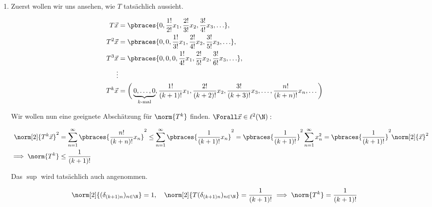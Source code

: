 \begin{solution}

\phantom{}

\begin{enumerate}[label = (\alph*)]

  \item
  Zuerst wollen wir uns ansehen, wie $T$ tatsächlich aussieht.

  \begin{align*}
    T \vec x
    & =
    \pbraces
    {
      0,
      \frac{1!}{2!} x_1,
      \frac{2!}{3!} x_2,
      \frac{3!}{4!} x_3,
      \ldots
    }, \\
    T^2 \vec x
    & =
    \pbraces
    {
      0, 0,
      \frac{1!}{3!} x_1,
      \frac{2!}{4!} x_2,
      \frac{3!}{5!} x_3,
      \ldots
    }, \\
    T^3 \vec x
    & =
    \pbraces
    {
      0, 0, 0,
      \frac{1!}{4!} x_1,
      \frac{2!}{5!} x_2,
      \frac{3!}{6!} x_3,
      \ldots
    }, \\
    \vdots \\
    T^k \vec x
    & =
    \bigg (
      \underbrace{0, \ldots, 0}_{k \text{-mal}},
      \frac{1!}{(k+1)!} x_1,
      \frac{2!}{(k+2)!} x_2,
      \frac{3!}{(k+3)!} x_3,
      \ldots,
      \frac{n!}{(k+n)!} x_n,
      \ldots
    \bigg )
  \end{align*}

  Wir wollen nun eine geeignete Abschätzung für $\norm{T^k}$ finden.
  $\Forall \vec x \in \ell^2(\N):$

  \begin{align*}
    \norm[2]{T^k \vec x}^2
    & =
    \sum_{n=1}^\infty
    \pbraces
    {
      \frac{n!}{(k+n)!}
      x_n
    }^2
    \leq
    \sum_{n=1}^\infty
    \pbraces
    {
      \frac{1}{(k+1)!}
      x_n
    }^2
    =
    \pbraces{\frac{1}{(k+1)!}}^2
    \sum_{n=1}^\infty x_n^2
    =
    \pbraces{\frac{1}{(k+1)!}}^2
    \norm[2]{\vec x}^2 \\
    \implies
    \norm{T^k}
    & \leq
    \frac{1}{(k+1)!}
  \end{align*}

  Das $\sup$ wird tatsächlich auch angenommen.

  \begin{align*}
    \norm[2]{(\delta_{(k+1) n})_{n \in \N}} = 1,
    \quad
    \norm[2]{T (\delta_{(k+1) n})_{n \in \N}}
    =
    \frac{1}{(k+1)!}
    \implies
    \norm{T^k}
    =
    \frac{1}{(k+1)!}
  \end{align*}


\end{enumerate}
\end{solution}
